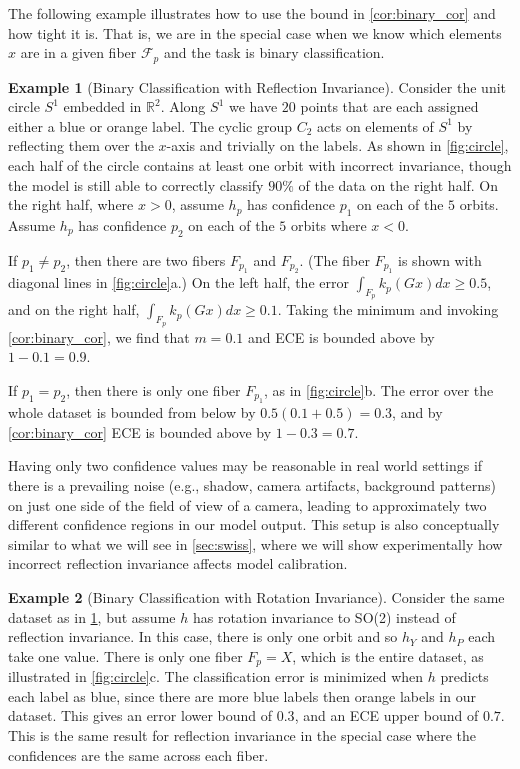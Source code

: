 \documentclass[10pt]{article} %
\theoremstyle{definition}
\newtheorem{example}{Example}
\begin{document}
The following example illustrates how to use the bound in \cref{cor:binary_cor} and how tight it is. That is, we are in the special case when we know which elements $x$ are in a given fiber $\mathcal{F}_p$ and the task is binary classification.

\begin{example}[Binary Classification with Reflection Invariance] \label{ex:reflect}
Consider the unit circle $S^1$ embedded in $\mathbb{R}^2$. Along $S^1$ we have $20$ points that are each assigned either a blue or orange label. The cyclic group $C_2$ acts on elements of $S^1$ by reflecting them over the $x$-axis and trivially on the labels. As shown in  \cref{fig:circle}, each half of the circle contains at least one orbit with incorrect invariance, though the model is still able to correctly classify $90\%$ of the data on the right half. On the right half, where $x > 0$, assume $h_p$ has confidence $p_1$ on each of the $5$ orbits. Assume $h_p$ has confidence $p_2$ on each of the $5$ orbits where $x < 0$.

If $p_1 \neq p_2$, then there are two fibers $F_{p_1}$ and $F_{p_2}$. (The fiber $F_{p_1}$ is shown with diagonal lines in \cref{fig:circle}a.) On the left half, the error $\int_{F_p}k_p(Gx)dx \geq 0.5$, and on the right half, $\int_{F_p}k_p(Gx)dx \geq 0.1$. Taking the minimum and invoking \cref{cor:binary_cor}, we find that $m = 0.1$ and ECE is bounded above by $1 - 0.1 = 0.9$.

If $p_1 = p_2$, then there is only one fiber $F_{p_1}$, as in \cref{fig:circle}b. The error over the whole dataset is bounded from below by $0.5 (0.1 + 0.5) = 0.3$, and by \cref{cor:binary_cor} ECE is bounded above by $1 - 0.3 = 0.7$. 
\end{example}


Having only two confidence values may be reasonable in real world settings if there is a prevailing noise (e.g., shadow, camera artifacts, background patterns) on just one side of the field of view of a camera, leading to approximately two different confidence regions in our model output. This setup is also conceptually similar to what we will see in \cref{sec:swiss}, where we will show experimentally how incorrect reflection invariance affects model calibration.

\begin{example}[Binary Classification with Rotation Invariance]
Consider the same dataset as in  \cref{ex:reflect}, but assume $h$ has rotation invariance to SO(2) instead of reflection invariance. In this case, there is only one orbit and so $h_Y$ and $h_P$ each take one value. There is only one fiber $F_p = X$, which is the entire dataset, as illustrated in \cref{fig:circle}c. The classification error is  minimized when $h$ predicts each label as blue, since there are more blue labels then orange labels in our dataset. This gives an error lower bound of $0.3$, and an ECE upper bound of $0.7$. This is the same result for reflection invariance in the special case where the confidences are the same across each fiber. 
\end{example}
\end{document}
